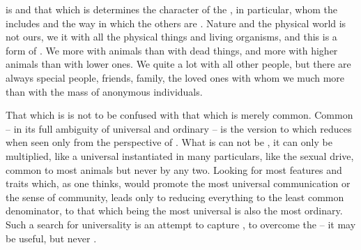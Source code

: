 
%
%
%
%
%

\pa\label{pa:communion}
 is  and that which is  determines the
character of the , in particular, whom the  includes
and the way in which the others are .  Nature and the physical
world is not ours, we  it with all the physical things and living
organisms, and this is a form of .  We  more with
animals than with dead things, and more with higher animals than with
lower ones.  We  quite a lot with all other people, but there are
always special people, friends, family, the loved ones with whom we 
much more than with the mass of anonymous individuals.

That which is  is not to be confused with that which is merely
common.  Common -- in its full ambiguity of universal and ordinary -- is the
 version to which  reduces when seen only from the
perspective of . What is  can not be , it
can only be multiplied, like a universal instantiated in many particulars, like
the sexual drive, common to most animals but never  by any two.
Looking for most  features and traits which, as one thinks, would
promote the most universal communication or the sense of community, leads only
to reducing everything to the least common denominator, to that which being the
most universal is also the most ordinary.  Such a search for universality is an
attempt to capture , to overcome the  --
it may be useful, but never .

